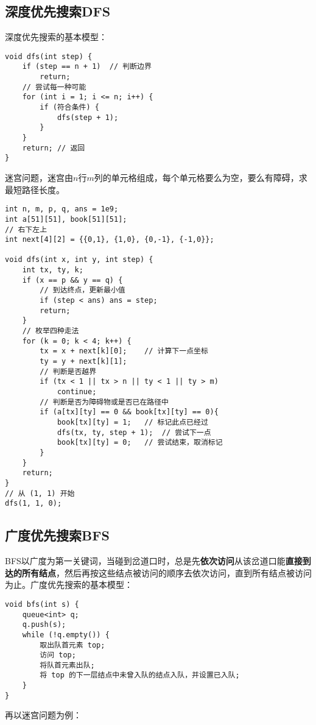 \subsection{深度优先搜索DFS}

深度优先搜索的基本模型：

\begin{lstlisting}
void dfs(int step) {
	if (step == n + 1)	// 判断边界
		return;
	// 尝试每一种可能
	for (int i = 1; i <= n; i++) {
		if (符合条件) {
			dfs(step + 1);
		}
	}
	return;	// 返回
}
\end{lstlisting}

迷宫问题，迷宫由$n$行$m$列的单元格组成，每个单元格要么为空，要么有障碍，求最短路径长度。

\begin{lstlisting}
int n, m, p, q, ans = 1e9;
int a[51][51], book[51][51];
// 右下左上
int next[4][2] = {{0,1}, {1,0}, {0,-1}, {-1,0}};

void dfs(int x, int y, int step) {
	int tx, ty, k;
	if (x == p && y == q) {
		// 到达终点，更新最小值
		if (step < ans)	ans = step;
		return;
	}
	// 枚举四种走法
	for (k = 0; k < 4; k++) {
		tx = x + next[k][0];	// 计算下一点坐标
		ty = y + next[k][1];
		// 判断是否越界
		if (tx < 1 || tx > n || ty < 1 || ty > m)
			continue;
		// 判断是否为障碍物或是否已在路径中
		if (a[tx][ty] == 0 && book[tx][ty] == 0){
			book[tx][ty] = 1;	// 标记此点已经过
			dfs(tx, ty, step + 1);	// 尝试下一点
			book[tx][ty] = 0;	// 尝试结束，取消标记
		}
	}
	return;
}
// 从 (1, 1) 开始
dfs(1, 1, 0);
\end{lstlisting}

\subsection{广度优先搜索BFS}

BFS以广度为第一关键词，当碰到岔道口时，总是先\textbf{依次访问}从该岔道口能\textbf{直接到达的所有结点}，然后再按这些结点被访问的顺序去依次访问，直到所有结点被访问为止。广度优先搜索的基本模型：

\begin{lstlisting}
void bfs(int s) {
	queue<int> q;
	q.push(s);
	while (!q.empty()) {
		取出队首元素 top;
		访问 top;
		将队首元素出队;
		将 top 的下一层结点中未曾入队的结点入队，并设置已入队;
	}
}
\end{lstlisting}

再以迷宫问题为例：

